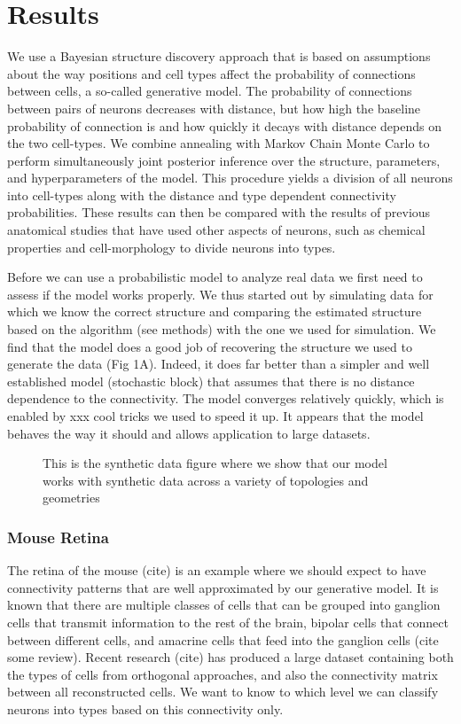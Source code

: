 \documentclass{article}
\begin{document}
\section{Results}
We use a Bayesian structure discovery approach that is based on
assumptions about the way positions and cell types affect the
probability of connections between cells, a so-called generative
model. The probability of connections between pairs of neurons
decreases with distance, but how high the baseline probability of
connection is and how quickly it decays with distance depends on the
two cell-types. We combine annealing with Markov Chain Monte Carlo to
perform simultaneously joint posterior inference over the structure,
parameters, and hyperparameters of the model. This procedure yields a
division of all neurons into cell-types along with the distance and
type dependent connectivity probabilities. These results can then be
compared with the results of previous anatomical studies that have
used other aspects of neurons, such as chemical properties and
cell-morphology to divide neurons into types.

Before we can use a probabilistic model to analyze real data we first
need to assess if the model works properly. We thus started out by
simulating data for which we know the correct structure and comparing
the estimated structure based on the algorithm (see methods) with the
one we used for simulation. We find that the model does a good job of
recovering the structure we used to generate the data (Fig
1A). Indeed, it does far better than a simpler and well established
model (stochastic block) that assumes that there is no distance
dependence to the connectivity. The model converges relatively
quickly, which is enabled by xxx cool tricks we used to speed it
up. It appears that the model behaves the way it should and allows
application to large datasets.

\begin{figure}
  \centering 
  \caption{This is the synthetic data figure where we show that our model works with synthetic data across a variety of topologies and geometries}
\end{figure}

\subsubsection{Mouse Retina}
The retina of the mouse (cite) is an example where we should expect to
have connectivity patterns that are well approximated by our
generative model. It is known that there are multiple classes of cells
that can be grouped into ganglion cells that transmit information to
the rest of the brain, bipolar cells that connect between different
cells, and amacrine cells that feed into the ganglion cells (cite some
review). Recent research (cite) has produced a large dataset
containing both the types of cells from orthogonal approaches, and
also the connectivity matrix between all reconstructed cells. We want
to know to which level we can classify neurons into types based on
this connectivity only.
\end{document}

